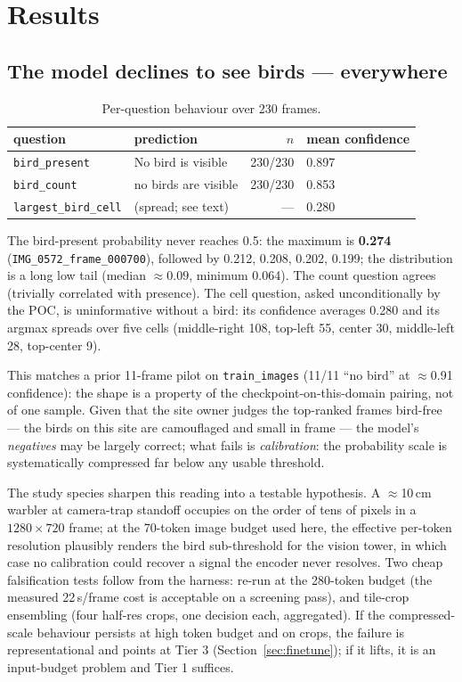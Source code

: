 \documentclass[11pt]{article}
\newcommand{\code}[1]{\texttt{#1}}
\begin{document}
\section{Results}
\label{sec:results}

\subsection{The model declines to see birds --- everywhere}

\begin{table}[t]
\centering
\caption{Per-question behaviour over 230 frames.}
\label{tab:answers}
\begin{tabular}{llrl}
\toprule
question & prediction & $n$ & mean confidence \\
\midrule
\code{bird\_present} & No bird is visible & 230/230 & 0.897 \\
\code{bird\_count}   & no birds are visible & 230/230 & 0.853 \\
\code{largest\_bird\_cell} & (spread; see text) & --- & 0.280 \\
\bottomrule
\end{tabular}
\end{table}

The bird-present probability never reaches 0.5: the maximum is \textbf{0.274}
(\code{IMG\_0572\_frame\_000700}), followed by 0.212, 0.208, 0.202, 0.199;
the distribution is a long low tail (median $\approx 0.09$, minimum 0.064).
The count question agrees (trivially correlated with presence). The cell
question, asked unconditionally by the POC, is uninformative without a bird:
its confidence averages 0.280 and its argmax spreads over five cells
(middle-right 108, top-left 55, center 30, middle-left 28, top-center 9).

This matches a prior 11-frame pilot on \code{train\_images} (11/11 ``no bird''
at $\approx$0.91 confidence): the shape is a property of the
checkpoint-on-this-domain pairing, not of one sample. Given that the site
owner judges the top-ranked frames bird-free --- the birds on this site are
camouflaged and small in frame --- the model's \emph{negatives} may be largely
correct; what fails is \emph{calibration}: the probability scale is
systematically compressed far below any usable threshold.

The study species sharpen this reading into a testable hypothesis. A
$\approx$10\,cm warbler at camera-trap standoff occupies on the order of tens
of pixels in a $1280\times720$ frame; at the 70-token image budget used here,
the effective per-token resolution plausibly renders the bird sub-threshold
for the vision tower, in which case no calibration could recover a signal the
encoder never resolves. Two cheap falsification tests follow from the
harness: re-run at the 280-token budget (the measured 22\,s/frame cost is
acceptable on a screening pass), and tile-crop ensembling (four half-res
crops, one decision each, aggregated). If the compressed-scale behaviour
persists at high token budget and on crops, the failure is representational
and points at Tier 3 (Section~\ref{sec:finetune}); if it lifts, it is an
input-budget problem and Tier 1 suffices.
\end{document}

